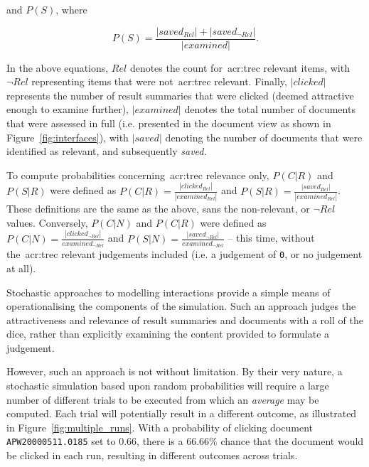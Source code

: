 and $P(S)$, where

\begin{equation}
    P(S) = \frac{|saved_{Rel}| + | saved_{\neg Rel} |}{|examined|}.
\end{equation}

In the above equations, $Rel$ denotes the count for~\gls{acr:trec} relevant items, with $\neg Rel$ representing items that were not~\gls{acr:trec} relevant. Finally, $|clicked|$ represents the number of result summaries that were clicked (deemed attractive enough to examine further), $|examined|$ denotes the total number of documents that were assessed in full (i.e. presented in the document view as shown in Figure~\ref{fig:interfaces}), with $|saved|$ denoting the number of documents that were identified as relevant, and subsequently \emph{saved.}

To compute probabilities concerning~\gls{acr:trec} relevance only, $P(C|R)$ and $P(S|R)$ were defined as $P(C|R) = \frac{|clicked_{Rel}|}{|examined_{Rel}|}$ and $P(S|R) = \frac{|saved_{Rel}|}{|examined_{Rel}|}$. These definitions are the same as the above, sans the non-relevant, or $\neg Rel$ values. Conversely, $P(C|N)$ and $P(C|R)$ were defined as $P(C|N) = \frac{|clicked_{\neg Rel}|}{examined_{\neg Rel}}$ and $P(S|N) = \frac{|saved_{\neg Rel}|}{examined_{\neg Rel}}$ -- this time, without the~\gls{acr:trec} relevant judgements included (i.e. a judgement of \texttt{0}, or no judgement at all).

Stochastic approaches to modelling interactions provide a simple means of operationalising the components of the simulation. Such an approach judges the attractiveness and relevance of result summaries and documents with a roll of the dice, rather than explicitly examining the content provided to formulate a judgement.

However, such an approach is not without limitation. By their very nature, a stochastic simulation based upon random probabilities will require a large number of different trials to be executed from which an \emph{average} may be computed. Each trial will potentially result in a different outcome, as illustrated in Figure~\ref{fig:multiple_runs}. With a probability of clicking document \texttt{APW20000511.0185} set to $0.66$, there is a $66.66\%$ chance that the document would be clicked in each run, resulting in different outcomes across trials.

